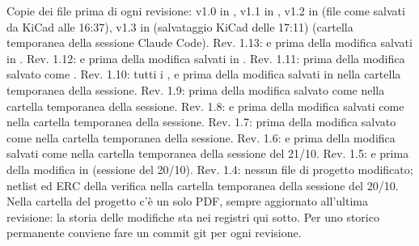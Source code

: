 {\small Copie dei file prima di ogni revisione: v1.0 in , v1.1 in , v1.2 in  (file come salvati da KiCad alle 16:37), v1.3 in  (salvataggio KiCad delle 17:11) (cartella temporanea della sessione Claude Code). Rev. 1.13:  e  prima della modifica salvati in . Rev. 1.12:  e  prima della modifica salvati in . Rev. 1.11:  prima della modifica salvato come . Rev. 1.10: tutti i ,  e  prima della modifica salvati in  nella cartella temporanea della sessione. Rev. 1.9:  prima della modifica salvato come  nella cartella temporanea della sessione. Rev. 1.8:  e  prima della modifica salvati come  nella cartella temporanea della sessione. Rev. 1.7:  prima della modifica salvato come  nella cartella temporanea della sessione. Rev. 1.6:  e  prima della modifica salvati come  nella cartella temporanea della sessione del 21/\allowbreak{}10. Rev. 1.5:  e  prima della modifica in  (sessione del 20/\allowbreak{}10). Rev. 1.4: nessun file di progetto modificato; netlist ed ERC della verifica nella cartella temporanea della sessione del 20/\allowbreak{}10. Nella cartella del progetto c'è un solo PDF, sempre aggiornato all'ultima revisione: la storia delle modifiche sta nei registri qui sotto. Per uno storico permanente conviene fare un commit git per ogni revisione.}

